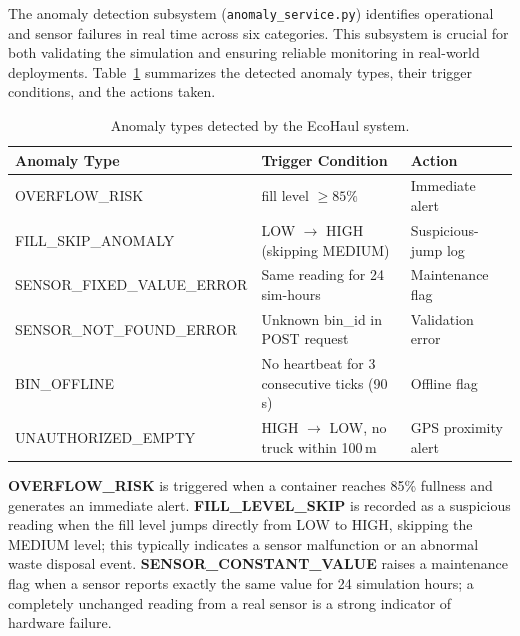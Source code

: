 \documentclass[12pt,a4paper]{report}
\begin{document}
\indent The anomaly detection subsystem (\texttt{anomaly\_service.py}) identifies operational and sensor failures in real time across six categories. This subsystem is crucial for both validating the simulation and ensuring reliable monitoring in real-world deployments. Table~\ref{tab:anomaly_types} summarizes the detected anomaly types, their trigger conditions, and the actions taken.

\usepackage{booktabs} %
\usepackage{float}    %

\begin{table}[H]
\centering
\caption{Anomaly types detected by the EcoHaul system.}
\label{tab:anomaly_types}
\small %
\begin{tabular}{lp{6cm}l} %
\toprule
\textbf{Anomaly Type} & \textbf{Trigger Condition} & \textbf{Action} \\
\midrule
OVERFLOW\_RISK & fill level $\geq 85\%$ & Immediate alert \\
\addlinespace %
FILL\_SKIP\_ANOMALY & LOW $\rightarrow$ HIGH (skipping MEDIUM) & Suspicious-jump log \\
\addlinespace
SENSOR\_FIXED\_VALUE\_ERROR & Same reading for 24 sim-hours & Maintenance flag \\
\addlinespace
SENSOR\_NOT\_FOUND\_ERROR & Unknown bin\_id in POST request & Validation error \\
\addlinespace
BIN\_OFFLINE & No heartbeat for 3 consecutive ticks (90\,s) & Offline flag \\
\addlinespace
UNAUTHORIZED\_EMPTY & HIGH $\rightarrow$ LOW, no truck within 100\,m & GPS proximity alert \\
\bottomrule
\end{tabular}
\end{table}
\indent

\indent \textbf{OVERFLOW\_RISK} is triggered when a container reaches 85\% fullness and generates an immediate alert. \textbf{FILL\_LEVEL\_SKIP} is recorded as a suspicious reading when the fill level jumps directly from LOW to HIGH, skipping the MEDIUM level; this typically indicates a sensor malfunction or an abnormal waste disposal event. \textbf{SENSOR\_CONSTANT\_VALUE} raises a maintenance flag when a sensor reports exactly the same value for 24 simulation hours; a completely unchanged reading from a real sensor is a strong indicator of hardware failure.
\end{document}
